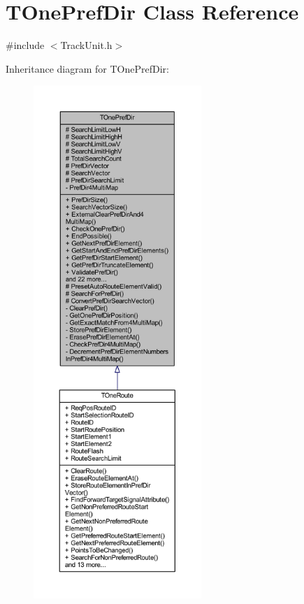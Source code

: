 \hypertarget{class_t_one_pref_dir}{}\section{T\+One\+Pref\+Dir Class Reference}
\label{class_t_one_pref_dir}


{\ttfamily \#include $<$Track\+Unit.\+h$>$}



Inheritance diagram for T\+One\+Pref\+Dir\+:\nopagebreak
\begin{figure}[H]
\begin{center}
\leavevmode
\includegraphics[height=550pt]{class_t_one_pref_dir__inherit__graph}
\end{center}
\end{figure}


